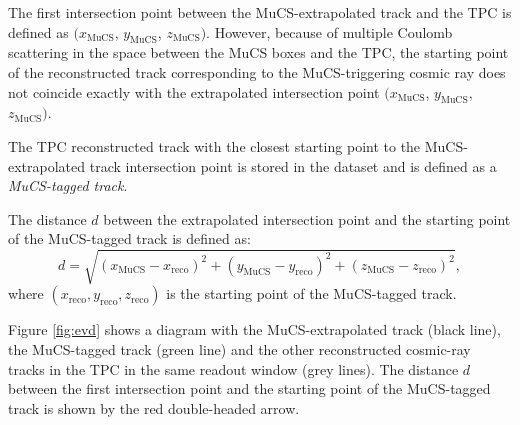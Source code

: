 \documentclass[a4paper,11pt]{article}
\begin{document}
The first intersection point between the MuCS-extrapolated track and the TPC is defined as $(x_{\mathrm{MuCS}}$, $y_{\mathrm{MuCS}}$, $z_{\mathrm{MuCS}})$. However, because of multiple Coulomb scattering in the space between the MuCS boxes and the TPC, the starting point of the reconstructed track corresponding to the MuCS-triggering cosmic ray does not coincide exactly with the extrapolated intersection point $(x_{\mathrm{MuCS}}$, $y_{\mathrm{MuCS}}$, $z_{\mathrm{MuCS}})$.

The TPC reconstructed track with the closest starting point to the MuCS-extrapolated track intersection point is stored in the dataset and is defined as a \emph{MuCS-tagged track}.

The distance $d$ between the extrapolated intersection point and the starting point of the MuCS-tagged track is defined as:
\begin{equation}\label{eq:d}
d = \sqrt{(x_{\mathrm{MuCS}}-x_{\mathrm{reco}})^2+(y_{\mathrm{MuCS}}-y_{\mathrm{reco}})^2+(z_{\mathrm{MuCS}}-z_{\mathrm{reco}})^2},
\end{equation}
where $(x_{\mathrm{reco}},y_{\mathrm{reco}},z_{\mathrm{reco}})$ is the starting point of the MuCS-tagged track.

Figure \ref{fig:evd} shows a diagram with the MuCS-extrapolated track (black line), the MuCS-tagged track (green line) and the other reconstructed cosmic-ray tracks in the TPC in the same readout window (grey lines). The distance $d$ between the first intersection point and the starting point of the MuCS-tagged track is shown by the red double-headed arrow.
\end{document}

